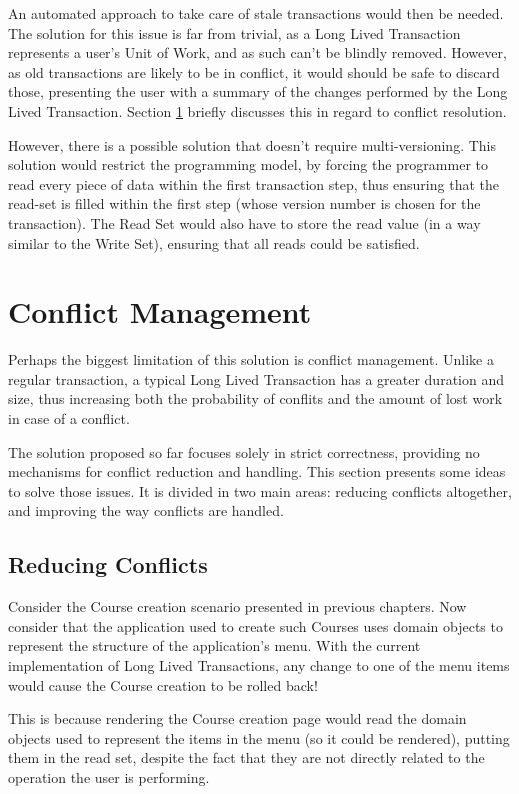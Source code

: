 An automated approach to take care of stale transactions would then be
needed. The solution for this issue is far from trivial, as a Long
Lived Transaction represents a user's Unit of Work, and as such can't
be blindly removed. However, as old transactions are likely to be in
conflict, it would should be safe to discard those, presenting the
user with a summary of the changes performed by the Long Lived
Transaction. Section \ref{sec:conflicts} briefly discusses this in
regard to conflict resolution.

However, there is a possible solution that doesn't require
multi-versioning. This solution would restrict the programming model,
by forcing the programmer to read every piece of data within the first
transaction step, thus ensuring that the read-set is filled within the
first step (whose version number is chosen for the transaction). The
Read Set would also have to store the read value (in a way similar to
the Write Set), ensuring that all reads could be satisfied.

\section{Conflict Management}
\label{sec:conflicts}

Perhaps the biggest limitation of this solution is conflict
management. Unlike a regular transaction, a typical Long Lived
Transaction has a greater duration and size, thus increasing both the
probability of conflits and the amount of lost work in case of a
conflict.

The solution proposed so far focuses solely in strict correctness,
providing no mechanisms for conflict reduction and handling. This
section presents some ideas to solve those issues. It is divided in
two main areas: reducing conflicts altogether, and improving the way
conflicts are handled.

\subsection{Reducing Conflicts}

Consider the Course creation scenario presented in previous
chapters. Now consider that the application used to create such
Courses uses domain objects to represent the structure of the
application's menu. With the current implementation of Long Lived
Transactions, any change to one of the menu items would cause the
Course creation to be rolled back!

This is because rendering the Course creation page would read the
domain objects used to represent the items in the menu (so it could be
rendered), putting them in the read set, despite the fact that they
are not directly related to the operation the user is performing.

